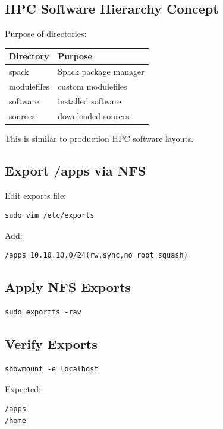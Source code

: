 \documentclass[11pt]{article}
\begin{document}
\subsection{HPC Software Hierarchy Concept}
\label{sec:orgc2fcd19}

Purpose of directories:

\begin{center}
\begin{tabular}{ll}
Directory & Purpose\\
\hline
spack & Spack package manager\\
modulefiles & custom modulefiles\\
software & installed software\\
sources & downloaded sources\\
\end{tabular}
\end{center}

This is similar to production HPC software layouts.
\subsection{Export /apps via NFS}
\label{sec:org2ade23b}

Edit exports file:

\begin{verbatim}
sudo vim /etc/exports
\end{verbatim}

Add:

\begin{verbatim}
/apps 10.10.10.0/24(rw,sync,no_root_squash)
\end{verbatim}
\subsection{Apply NFS Exports}
\label{sec:org9c9c8cc}

\begin{verbatim}
sudo exportfs -rav
\end{verbatim}
\subsection{Verify Exports}
\label{sec:org3e475f7}

\begin{verbatim}
showmount -e localhost
\end{verbatim}

Expected:

\begin{verbatim}
/apps
/home
\end{verbatim}
\end{document}
